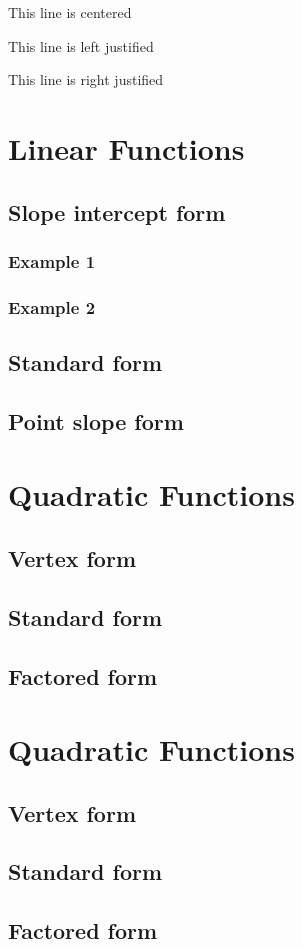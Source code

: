 \documentclass[11pt]{article}
\begin{document}
\vspace{1cm}

\begin{center}This line is centered\end{center}

\begin{flushleft}This line is left justified\end{flushleft}

\begin{flushright}This line is right justified\end{flushright}

\section{Linear Functions}
	\subsection{Slope intercept form}
		\subsubsection{Example 1}
		\subsubsection{Example 2}
	\subsection{Standard form}
	\subsection{Point slope form}
\section{Quadratic Functions}
	\subsection{Vertex form}
	\subsection{Standard form}
	\subsection{Factored form}
	
\section*{Quadratic Functions}
	\subsection{Vertex form}
	\subsection{Standard form}
	\subsection{Factored form}
\end{document}

